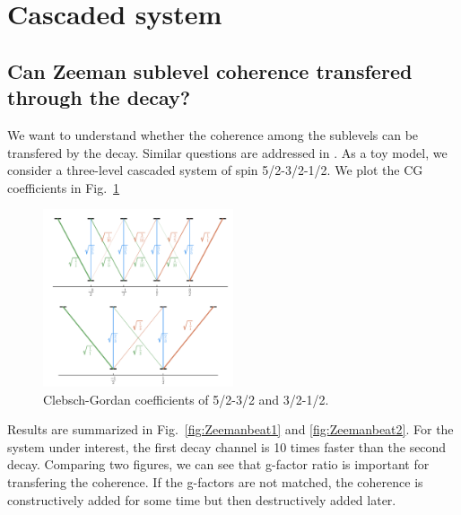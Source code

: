 \documentclass{article}
\begin{document}
\section{Cascaded system}

\subsection{Can Zeeman sublevel coherence transfered through the decay?}
We want to understand whether the coherence among the sublevels can be transfered by the decay. Similar questions are addressed in \cite{daltonTheoryCascadeEffects1979}. As a toy model, we consider a three-level cascaded system of spin 5/2-3/2-1/2. We plot the CG coefficients in Fig.~\ref{fig:cgcoeffs}

\begin{figure}[h!]
    \centering
    \includegraphics[width=0.5\textwidth]{CGcoeffs.png}
    \caption{Clebsch-Gordan coefficients of 5/2-3/2 and 3/2-1/2. \label{fig:cgcoeffs} }
\end{figure}

Results are summarized in Fig.~\ref{fig:Zeemanbeat1} and \ref{fig:Zeemanbeat2}. For the system under interest, the first decay channel is 10 times faster than the second decay. Comparing two figures, we can see that g-factor ratio is important for transfering the coherence. If the g-factors are not matched, the coherence is constructively added for some time but then destructively added later. 
\end{document}
